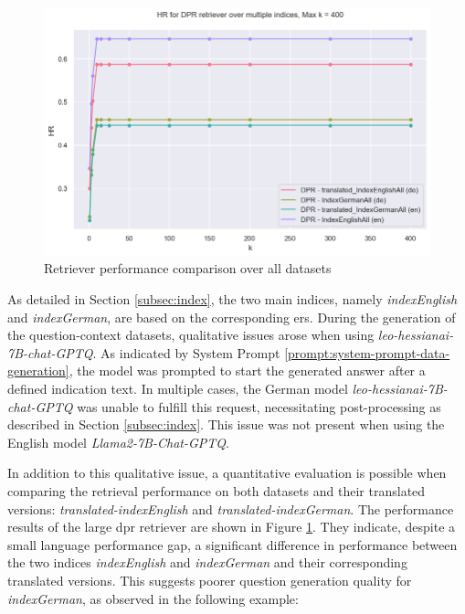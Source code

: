 \begin{figure}
    \centering
    \includegraphics[width=\textwidth]{Grafiken/Evaluation/Data_Generation/hr_dpr_all_400.png}
    \caption{Retriever performance comparison over all datasets}
    \label{fig:synthetic-data-generation-performance-comparison}
\end{figure}

As detailed in Section \ref{subsec:index}, the two main indices, namely \textit{indexEnglish} and \textit{indexGerman}, are based on the corresponding \gls{er}s. During the generation of the question-context datasets, qualitative issues arose when using \textit{leo-hessianai-7B-chat-GPTQ}. As indicated by System Prompt \ref{prompt:system-prompt-data-generation}, the model was prompted to start the generated answer after a defined indication text. In multiple cases, the German model \textit{leo-hessianai-7B-chat-GPTQ} was unable to fulfill this request, necessitating post-processing as described in Section \ref{subsec:index}. This issue was not present when using the English model \textit{Llama2-7B-Chat-GPTQ}. 

In addition to this qualitative issue, a quantitative evaluation is possible when comparing the retrieval performance on both datasets and their translated versions: \textit{translated-indexEnglish} and \textit{translated-indexGerman}. The performance results of the large \gls{dpr} retriever are shown in Figure \ref{fig:synthetic-data-generation-performance-comparison}. They indicate, despite a small language performance gap, a significant difference in performance between the two indices \textit{indexEnglish} and \textit{indexGerman} and their corresponding translated versions. This suggests poorer question generation quality for \textit{indexGerman}, as observed in the following example:

